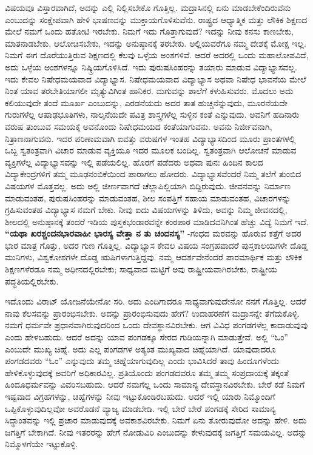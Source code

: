 ವಿಷಯವೂ ವಿಸ್ತಾರವಾಗಿದೆ, ಅದನ್ನು ಎಲ್ಲಿ ನಿಲ್ಲಿಸಬೇಕೊ ಗೊತ್ತಿಲ್ಲ. ಮದ್ರಾಸಿನಲ್ಲಿ ಏನು ಮಾಡಬೇಕೆಂದಿರುವೆನು ಎಂಬುದನ್ನು ಸಂಕ್ಷೇಪವಾಗಿ ಹೇಳಿ ಭಾಷಣವನ್ನು ಮುಕ್ತಾಯಗೊಳಿಸುವೆನು. ರಾಷ್ಟ್ರದ ಆಧ್ಯಾತ್ಮಿಕ ಮತ್ತು ಲೌಕಿಕ ಶಿಕ್ಷಣದ ಮೇಲೆ ನಮಗೆ ಒಂದು ಹತೋಟಿ ಇರಬೇಕು. ನಿಮಗೆ ಇದು ಗೊತ್ತಾಗುವುದೆ? ಇದನ್ನು ನೀವು ಕನಸು ಕಾಣಬೇಕು, ಮಾತನಾಡಬೇಕು, ಆಲೋಚಿಸಬೇಕು, ಇದನ್ನು ಅನುಷ್ಠಾನಕ್ಕೆ ತರಬೇಕು. ಅಲ್ಲಿಯವರೆಗೂ ನಮ್ಮ ದೇಶಕ್ಕೆ ಮೋಕ್ಷ ಇಲ್ಲ. ನಿಮಗೆ ಈಗ ದೊರೆಯುತ್ತಿರುವ ಶಿಕ್ಷಣದಲ್ಲಿ ಕೆಲವು ಒಳ್ಳೆಯ ಅಂಶಗಳಿವೆ. ಆದರೆ ಅದರಲ್ಲಿ ಒಂದು ಮಹಾಲೋಪವಿದೆ, ಅದು ಒಳ್ಳೆಯ ಅಂಶಗಳನ್ನೂ ನಿಷ್ಕ್ರಿಯಗೊಳಿಸಿದೆ. ಇದು ಪುರುಷಸಿಂಹರನ್ನು ತಯಾರು ಮಾಡುವ ವಿದ್ಯಾಭ್ಯಾಸವಲ್ಲ. ಇದು ಕೇವಲ ನಿಷೇಧಮಯವಾದ ವಿದ್ಯಾಭ್ಯಾಸ. ನಿಷೇಧಮಯವಾದ ವಿದ್ಯಾಭ್ಯಾಸ ಅಥವಾ ನಿಷೇಧ ಭಾವನೆಯ ಮೇಲೆ ನಿಂತ ಯಾವ ತರಬೇತಿಯಾಗಲೀ ಮೃತ್ಯುವಿಗಿಂತ ಹಾನಿಕರ. ಮಗುವನ್ನು ಶಾಲೆಗೆ ಕಳುಹಿಸುವರು. ಮೊದಲು ಅದು ಕಲಿಯುವುದೇ ತಂದೆ ಮೂರ್ಖ ಎಂಬುದನ್ನು, ಎರಡನೆಯದು ಅದರ ತಾತ ಹುಚ್ಚನೆನ್ನುವುದು, ಮೂರನೆಯದೇ ಗುರುಗಳೆಲ್ಲ ಆಷಾಢಭೂತಿಗಳು, ನಾಲ್ಕನೆಯದೇ ಪವಿತ್ರ ಶಾಸ್ತ್ರಗಳೆಲ್ಲ ಸುಳ್ಳಿನ ಕಂತೆ ಎನ್ನುವುದು. ಅವನಿಗೆ ಹದಿನಾರು ವರುಷ ತುಂಬುವ ಸಮಯಕ್ಕೆ ಅವನೊಂದು ನಿಷೇಧಮಯದ ಕಂತೆಯಾಗುವನು. ಅವನು ನಿರ್ಜೀವನಾಗಿ, ನಿತ್ರಾಣನಾಗುವನು. ಇದರ ಪರಿಣಾಮವಾಗಿ ಐವತ್ತು ವರುಷಗಳ ಇಂತಹ ವಿದ್ಯಾಭ್ಯಾಸದಿಂದ ಮೂರು ಪ್ರಾಂತಗಳಲ್ಲಿ ಒಬ್ಬ ಸ್ವತಂತ್ರವಾಗಿ ವಿಚಾರ ಮಾಡುವ ವ್ಯಕ್ತಿಯೂ ಇದರ ಮೂಲಕ ಬಂದಿಲ್ಲ. ಸ್ವತಂತ್ರವಾಗಿ ಆಲೋಚನೆ ಮಾಡುವ ವ್ಯಕ್ತಿಗಳೆಲ್ಲ ವಿದ್ಯಾಭ್ಯಾಸವನ್ನು ಇಲ್ಲಿ ಪಡೆಯಲಿಲ್ಲ. ಹೊರಗೆ ಪಡೆದರು ಅಥವಾ ಪುನಃ ಹಿಂದಿನ ಕಾಲದ ವಿದ್ಯಾಕೇಂದ್ರಗಳಿಗೆ ತಮ್ಮ ಮೂಢನಂಬಿಕೆಯಿಂದ ಪಾರಾಗಲು ಹೋದರು. ವಿದ್ಯಾಭ್ಯಾಸವೆಂದರೆ ನಿಮ್ಮ ತಲೆಗೆ ತುಂಬಿದ ವಿಷಯಗಳ ಮೊತ್ತವಲ್ಲ. ಅದು ಅಲ್ಲಿ ಜೀರ್ಣವಾಗದೆ ಚೆಲ್ಲಾಪಿಲ್ಲಿಯಾಗಿ ಬಿದ್ದಿರುವುದು. ಜೀವನವನ್ನು ನಿರ್ಮಾಣ ಮಾಡುವಂತಹ, ಪುರುಷಸಿಂಹರನ್ನು ಮಾಡುವಂತಹ, ಶೀಲ ಸಂಪತ್ತಿಗೆ ಸಹಾಯ ಮಾಡುವಂತಹ, ವಿಚಾರಗಳನ್ನು ಗ್ರಹಿಸುವಂತಹ ವಿದ್ಯಾಭ್ಯಾಸ ನಮಗೆ ಬೇಕು. ನೀವು ಐದು ವಿಷಯಗಳನ್ನು ತಿಳಿದು, ಅವನ್ನು ನಿಮ್ಮ ಜೀವನದಲ್ಲಿ, ಶೀಲದಲ್ಲಿ ಅನುಷ್ಠಾನಕ್ಕೆ ತಂದರೆ ಇಡಿಯ ಪುಸ್ತಕಭಂಡಾರವನ್ನೇ ಕಂಠಪಾಠ ಮಾಡಿದವನಿಗಿಂತ ಹೆಚ್ಚು ವಿದ್ಯೆ ನಿಮಗೆ ಇದೆ. \textbf{“ಯಥಾ ಖರಶ್ಚಂದನಭಾರವಾಹೀ ಭಾರಸ್ಯ ವೇತ್ತಾ ನ ತು ಚಂದನಸ್ಯ”} -ಗಂಧದ ಮರವನ್ನು ಹೊರುವ ಕತ್ತೆಗೆ ಅದರ ಭಾರ ಮಾತ್ರ ಗೊತ್ತು, ಅದರ ಗುಣ ಗೊತ್ತಿಲ್ಲ. ವಿದ್ಯಾಭ್ಯಾಸ ಕೇವಲ ವಿಷಯ ಸಂಗ್ರಹವಾದರೆ ಪುಸ್ತಕಾಲಯಗಳೇ ದೊಡ್ಡ ಮುನಿಗಳು, ವಿಶ್ವಕೋಶಗಳೇ ದೊಡ್ಡ ಋಷಿಗಳಾಗುತ್ತಿದ್ದವು. ನಮ್ಮ ಆದರ್ಶವೇನೆಂದರೆ ಪಾರಮಾರ್ಥಿಕ ಮತ್ತು ಲೌಕಿಕ ಶಿಕ್ಷಣಗಳೆರಡೂ ನಮ್ಮ ಅಧೀನದಲ್ಲಿರಬೇಕು; ಸಾಧ್ಯವಾದ ಮಟ್ಟಿಗೆ ಅವು ರಾಷ್ಟ್ರೀಯವಾಗಿರಬೇಕು, ರಾಷ್ಟ್ರೀಯ ಪದ್ಧತಿಯಲ್ಲಿರಬೇಕು.

\vskip 3pt

ಇದೊಂದು ವಿರಾಟ್​ ಯೋಜನೆಯೇನೋ ಸರಿ. ಅದು ಎಂದಿಗಾದರೂ ಸಾಧ್ಯವಾಗುವುದೇನೋ ನನಗೆ ಗೊತ್ತಿಲ್ಲ. ಆದರೆ ನಾವು ಕೆಲಸವನ್ನು ಪ್ರಾರಂಭಿಸಬೇಕು. ಅದನ್ನು ಪ್ರಾರಂಭಿಸುವುದು ಹೇಗೆ? ಉದಾಹರಣೆಗೆ ಮದ್ರಾಸನ್ನೇ ತೆಗೆದುಕೊಳ್ಳಿ. ನಮಗೆ ಧರ್ಮವೇ ಪ್ರಧಾನವಾಗಿರುವುದರಿಂದ ಒಂದು ದೇವಸ್ಥಾನವಿರಬೇಕು. ಆಗ ವಿವಿಧ ಪಂಗಡಗಳೆಲ್ಲ ಕಾದಾಡುವುವು ಎಂದು ಹೇಳಬಹುದು. ಆದರೆ ಅದನ್ನು ಯಾವ ಪಂಗಡಕ್ಕೂ ಸೇರದ ಗುಡಿಯನ್ನಾಗಿ ಮಾಡುತ್ತೇವೆ. ಅಲ್ಲಿ “ಓಂ” ಎಂಬುದೇ ಮುಖ್ಯ ಚಿಹ್ನೆ. ಅದು ಎಲ್ಲ ಪಂಗಡಗಳ ಅತ್ಯಂತ ಮುಖ್ಯವಾದ ಚಿಹ್ನೆಯಾಗಿದೆ. ಯಾವುದಾದರೂ ಪಂಗಡದವರು “ಓಂ” ಎನ್ನುವುದು ತಮ್ಮ ಚಿಹ್ನೆಯಾಗುವುದಿಲ್ಲ ಎಂದು ಭಾವಿಸಿದರೆ ತಾವು ಹಿಂದೂಗಳೆಂದು ಹೇಳಿಕೊಳ್ಳುವುದಕ್ಕೆ ಅವರಿಗೆ ಅಧಿಕಾರವಿಲ್ಲ. ಪ್ರತಿಯೊಂದು ಪಂಗಡದವರೂ ತಮ್ಮ ತಮ್ಮ ಸಂಪ್ರದಾಯಕ್ಕೆ ತಕ್ಕಂತೆ ಹಿಂದೂಧರ್ಮವನ್ನು ವಿವರಿಸಬಹುದು. ಆದರೆ ನಮಗೆಲ್ಲ ಒಂದು ಸಾಮಾನ್ಯ ದೇವಸ್ಥಾನವಿರಬೇಕು. ಬೇರೆ ಕಡೆ ನಿಮಗೆ ಇಷ್ಟವಾದ ವಿಗ್ರಹಗಳನ್ನು, ಚಿಹ್ನೆಗಳನ್ನು ನೀವು ಇಟ್ಟುಕೊಂಡಿರಬಹುದು. ಆದರೆ ಇಲ್ಲಿ ಯಾರು ನಿಮ್ಮೊಂದಿಗೆ ಒಪ್ಪಿಕೊಳ್ಳುವುದಿಲ್ಲವೋ ಅವರೊಡನೆ ವ್ಯಾಜ್ಯ ಮಾಡಬೇಡಿ. ಇಲ್ಲಿ ಬೇರೆ ಬೇರೆ ಪಂಗಡಕ್ಕೆ ಸೇರಿದ ಸಾಮಾನ್ಯ ಸಿದ್ಧಾಂತವನ್ನು ಇಲ್ಲಿ ಪ್ರಚಾರ ಮಾಡುವುದಕ್ಕೆ ಅವಕಾಶವಿರಬೇಕು. ನಿಮಗೆ ಏನು ತೋರುವುದೋ ಅದನ್ನು ಹೇಳಿ. ಅದು ಜಗತ್ತಿಗೆ ಬೇಕಾಗಿದೆ. ನೀವು ಇತರರನ್ನು ಹೇಗೆ ನೋಡುವಿರಿ ಎಂಬುದನ್ನು ಕೇಳುವುದಕ್ಕೆ ಜಗತ್ತಿಗೆ ಸಮಯವಿಲ್ಲ. ಅದನ್ನು ನಿಮ್ಮೊಳಗೆಯೇ ಇಟ್ಟುಕೊಳ್ಳಿ.

